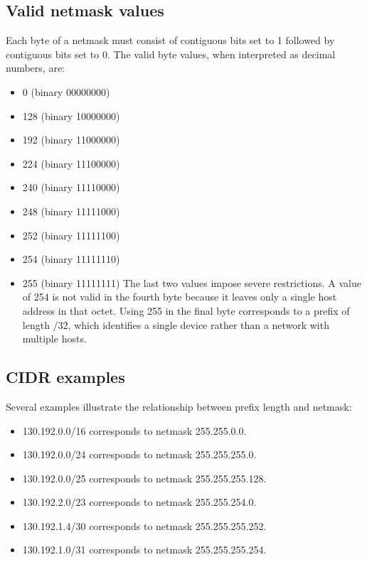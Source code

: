 \subsection{Valid netmask values}

Each byte of a netmask must consist of contiguous bits set to 1 followed by contiguous bits set to 0. The valid byte values, when interpreted as decimal numbers, are:

\begin{itemize}
\item 0 (binary 00000000)
\item 128 (binary 10000000)
\item 192 (binary 11000000)
\item 224 (binary 11100000)
\item 240 (binary 11110000)
\item 248 (binary 11111000)
\item 252 (binary 11111100)
\item 254 (binary 11111110)
\item 255 (binary 11111111) The last two values impose severe restrictions. A value of 254 is not valid in the fourth byte because it leaves only a single host address in that octet. Using 255 in the final byte corresponds to a prefix of length /32, which identifies a single device rather than a network with multiple hosts.
\end{itemize}

\subsection{CIDR examples}

Several examples illustrate the relationship between prefix length and netmask:

\begin{itemize}
\item 130.192.0.0/16 corresponds to netmask 255.255.0.0.
\item 130.192.0.0/24 corresponds to netmask 255.255.255.0.
\item 130.192.0.0/25 corresponds to netmask 255.255.255.128.
\item 130.192.2.0/23 corresponds to netmask 255.255.254.0.
\item 130.192.1.4/30 corresponds to netmask 255.255.255.252.
\item 130.192.1.0/31 corresponds to netmask 255.255.255.254.
\end{itemize}

